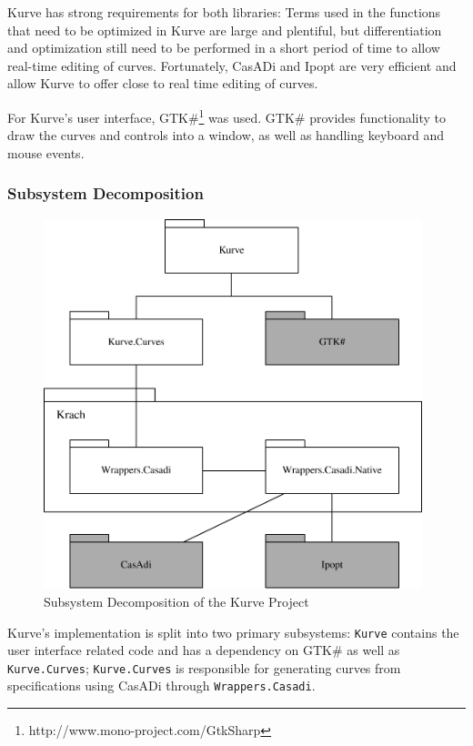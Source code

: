 \documentclass[a4paper]{article}
\begin{document}
				 Kurve has strong requirements for both libraries: Terms used in the functions that need to be optimized in Kurve are large and plentiful, but differentiation and optimization still need to be performed in a short period of time to allow real-time editing of curves. Fortunately, CasADi and Ipopt are very efficient and allow Kurve to offer close to real time editing of curves.

				For Kurve's user interface, GTK\#\footnote{http://www.mono-project.com/GtkSharp} was used. GTK\# provides functionality to draw the curves and controls into a window, as well as handling keyboard and mouse events.
				
			\subsubsection{Subsystem Decomposition}	
			
				\begin{figure}[htb]
					\centering
					\includegraphics[width=110mm]{content/output/subsystems.pdf}
					\caption{Subsystem Decomposition of the Kurve Project}
					\label{figure:subsystem_decomposition}
				\end{figure}
				
				Kurve's implementation is split into two primary subsystems: \verb|Kurve| contains the user interface related code and has a dependency on GTK\# as well as \verb|Kurve.Curves|; \verb|Kurve.Curves| is responsible for generating curves from specifications using CasADi through \verb|Wrappers.Casadi|. 
				
\end{document}
